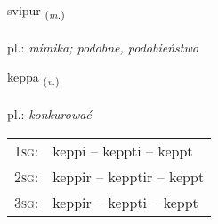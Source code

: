 \documentclass[frontgrid, backgrid]{flacards}\usepackage[]{graphicx}\usepackage[]{xcolor}
\begin{document}
\renewcommand{\flhead}{\vskip5pt \fboxsep=0pt {\small\bfseries\footnotesize Nafnorð | Noun}}
\renewcommand{\fcfoot}{\vskip5pt \fboxsep=0pt \hspace{2pt}{\small\bfseries\footnotesize 2K}}

\renewcommand{\blhead}{\vskip5pt {\small\bfseries\footnotesize Nafnorð | Noun }}
\renewcommand{\bcfoot}{\vskip5pt \hspace{2pt}{\small\bfseries\footnotesize 2K}}


{svipur \small{\textsubscript{(\textit{m.})}} \\[1ex] %
\textphonetic{[svɪːpʏr]} \\
pl.: \emph{mimika; podobne, podobieństwo} \\  [2ex]
\renewcommand*{\arraystretch}{0.8}
}

\renewcommand{\flhead}{\vskip5pt \fboxsep=0pt {\small\bfseries\footnotesize Sagnorð | Verb}}
\renewcommand{\fcfoot}{\vskip5pt \fboxsep=0pt \hspace{2pt}{\small\bfseries\footnotesize 2K}}

\renewcommand{\blhead}{\vskip5pt {\small\bfseries\footnotesize Sagnorð | Verb }}
\renewcommand{\bcfoot}{\vskip5pt \hspace{2pt}{\small\bfseries\footnotesize 2K}}


{keppa \small{\textsubscript{(\textit{v.})}} \\[1ex] %
\textphonetic{[cʰɛhpa]} \\
pl.: \emph{konkurować} \\  [2ex]
\renewcommand*{\arraystretch}{0.8}
\begin{tabular}{p{1cm}l}
\textsc{1sg}: & keppi -- keppti -- keppt \\ 
\textsc{2sg}: & keppir -- kepptir -- keppt \\ 
\textsc{3sg}: & keppir -- keppti -- keppt \\ 
\end{tabular}
}
\end{document}

